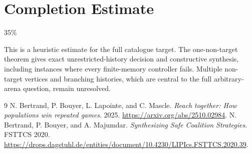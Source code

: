 \documentclass[11pt]{article}
\theoremstyle{definition}
\theoremstyle{remark}
\begin{document}
\section{Completion Estimate}
35\%

This is a heuristic estimate for the full catalogue target.
The one-non-target theorem gives exact unrestricted-history decision and
constructive synthesis, including instances where every finite-memory
controller fails. Multiple non-target vertices and branching histories,
which are central to the full arbitrary-arena question, remain unresolved.

\begin{thebibliography}{9}
 N. Bertrand, P. Bouyer, L. Lapointe, and C. Mascle.
\emph{Reach together: How populations win repeated games}. 2025.
\url{https://arxiv.org/abs/2510.02984}.
 N. Bertrand, P. Bouyer, and A. Majumdar.
\emph{Synthesizing Safe Coalition Strategies}. FSTTCS 2020.
\url{https://drops.dagstuhl.de/entities/document/10.4230/LIPIcs.FSTTCS.2020.39}.
\end{thebibliography}
\end{document}
